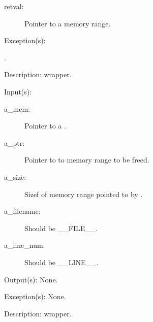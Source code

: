 \begin{capi}
\begin{capilist}
		\begin{description}\item[]
		\item[retval: ]
			Pointer to a memory range.
		\end{description}
	\item[Exception(s): ]
		\begin{description}\item[]
		\item[.]
		\end{description}
	\item[Description: ]
		 wrapper.
	\end{capilist}
\label{mem_free_e}
\label{mem_free}
\label{_cw_free}
	\begin{capilist}
	\item[Input(s): ]
		\begin{description}\item[]
		\item[a\_mem: ]
			Pointer to a .
		\item[a\_ptr: ]
			Pointer to to memory range to be freed.
		\item[a\_size: ]
			Sizef of memory range pointed to by .
		\item[a\_filename: ]
			Should be \_\_FILE\_\_.
		\item[a\_line\_num: ]
			Should be \_\_LINE\_\_.
		\end{description}
	\item[Output(s): ] None.
	\item[Exception(s): ] None.
	\item[Description: ]
		 wrapper.
	\end{capilist}
\end{capi}
